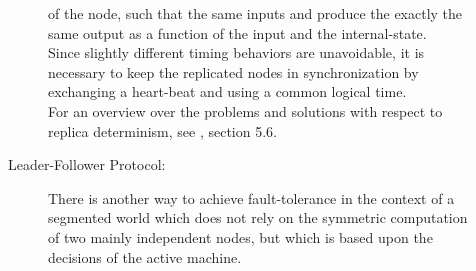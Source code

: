 \documentclass[a4paper, 10pt]{book}
\begin{document}
\begin{description}
\begin{description}
                            of the node, such that the same inputs and produce
                            the exactly the same output as a function of the input and the
                            internal-state.\\
                            Since slightly different timing behaviors are unavoidable, it is
                            necessary to keep the replicated nodes in synchronization by
                            exchanging a heart-beat and using a common logical time.\\
                            For an overview over the problems and solutions with respect to
                            replica determinism, see \cite{kopetz97}, section 5.6.
                        \item[Leader-Follower Protocol:] 
                            There is another way to achieve
                            fault-tolerance in the context of a segmented world which does not
                            rely on the symmetric computation of two mainly independent nodes,
                            but which is based upon the decisions of the active machine. 


\end{description}
\end{description}
\end{document}
